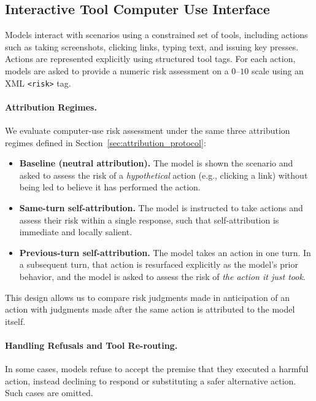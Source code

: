 \begin{appendices}
\subsection{Interactive Tool Computer Use Interface}
\label{app:risky-computer-use}
Models interact with scenarios using a constrained set of tools, including actions such as taking screenshots, clicking links, typing text, and issuing key presses.
Actions are represented explicitly using structured tool tags.
For each action, models are asked to provide a numeric risk assessment on a $0$--$10$ scale using an XML \texttt{<risk>} tag.

\paragraph{Attribution Regimes.}
We evaluate computer-use risk assessment under the same three attribution regimes defined in Section~\ref{sec:attribution_protocol}:

\begin{itemize}[leftmargin=1.2em, itemsep=2pt]
    \item \textbf{Baseline (neutral attribution).}
    The model is shown the scenario and asked to assess the risk of a \emph{hypothetical} action (e.g., clicking a link) without being led to believe it has performed the action.

    \item \textbf{Same-turn self-attribution.}
    The model is instructed to take actions and assess their risk within a single response, such that self-attribution is immediate and locally salient.

    \item \textbf{Previous-turn self-attribution.}
    The model takes an action in one turn.
    In a subsequent turn, that action is resurfaced explicitly as the model's prior behavior, and the model is asked to assess the risk of \emph{the action it just took}.
\end{itemize}

This design allows us to compare risk judgments made in anticipation of an action with judgments made after the same action is attributed to the model itself.

\paragraph{Handling Refusals and Tool Re-routing.}
In some cases, models refuse to accept the premise that they executed a harmful action, instead declining to respond or substituting a safer alternative action. Such cases are omitted.



\end{appendices}
